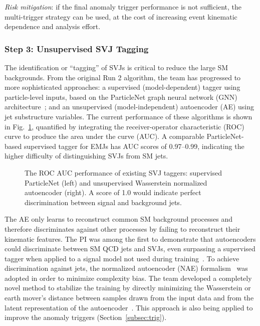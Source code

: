 \textit{Risk mitigation}: if the final anomaly trigger performance is not sufficient, the multi-trigger strategy can be used, at the cost of increasing event kinematic dependence and analysis effort.

\subsubsection{Step 3: Unsupervised SVJ Tagging}\label{subsec:tagging}

The identification or ``tagging'' of SVJs is critical to reduce the large SM backgrounds.
From the original Run 2 algorithm, the team has progressed to more sophisticated approaches:
a supervised (model-dependent) tagger using particle-level inputs, based on the ParticleNet graph neural network (GNN) architecture~\cite{Qu:2019gqs};
and an unsupervised (model-independent) autoencoder (AE) using jet substructure variables.
The current performance of these algorithms is shown in Fig.~\ref{fig:svjtaggers}, quantified by integrating the receiver-operator characteristic (ROC) curve to produce the area under the curve (AUC).
A comparable ParticleNet-based supervised tagger for EMJs has AUC scores of 0.97--0.99, indicating the higher difficulty of distinguishing SVJs from SM jets.

\begin{figure}[htb!]
\centering
{}
\caption{The ROC AUC performance of existing SVJ taggers: supervised ParticleNet (left) and unsupervised Wasserstein normalized autoencoder (right).
A score of 1.0 would indicate perfect discrimination between signal and background jets.}
\label{fig:svjtaggers}
\end{figure}

The AE only learns to reconstruct common SM background processes and therefore discriminates against other processes by failing to reconstruct their kinematic features.
The PI was among the first to demonstrate that autoencoders could discriminate between SM QCD jets and SVJs, even surpassing a supervised tagger when applied to a signal model not used during training~\cite{Canelli:2021aps}.
To achieve discrimination against \ttbar jets, the normalized autoencoder (NAE) formalism~\cite{Dillon:2022mkq} was adopted in order to minimize complexity bias.
The team developed a completely novel method to stabilize the training by directly minimizing the Wasserstein or earth mover's distance
between samples drawn from the input data and from the latent representation of the autoencoder~\cite{Eble:2024tpr}.
This approach is also being applied to improve the anomaly triggers (Section~\ref{subsec:trig}).


